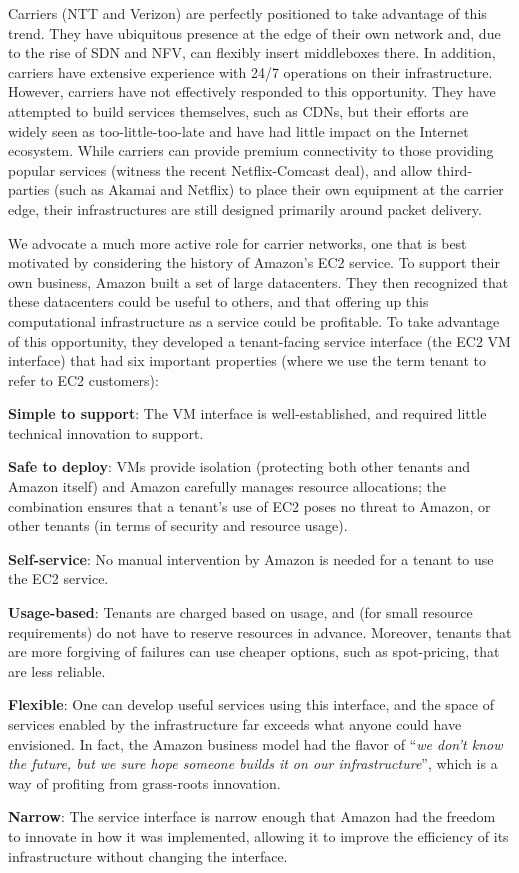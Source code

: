 Carriers (\eg NTT and Verizon) are perfectly positioned to take advantage of this trend. They have ubiquitous presence at the edge of their own network and, due to the rise of SDN and NFV, can flexibly insert middleboxes there. In addition, carriers have extensive experience with 24/7 operations on their infrastructure. However, carriers have not effectively responded to this opportunity. They have attempted to build services themselves, such as CDNs, but their efforts are widely seen as too-little-too-late and have had little impact on the Internet ecosystem. While carriers can provide premium connectivity to those providing popular services (witness the recent Netflix-Comcast deal), and allow third-parties (such as Akamai and Netflix) to place their own equipment at the carrier edge, their infrastructures are still designed primarily around packet delivery.

We advocate a much more active role for carrier networks, one that is best motivated by considering the history of Amazon's EC2 service. To support their own business, Amazon built a set of large datacenters. They then recognized that these datacenters could be useful to others, and that offering up this computational infrastructure as a service could be profitable. To take advantage of this opportunity, they developed a tenant-facing service interface (the EC2 VM interface) that had six important properties (where we use the term tenant to refer to EC2 customers):
\begin{compactitem}
\item {\bf Simple to support}: The VM interface is well-established, and required little technical innovation to support.
\item {\bf Safe to deploy}: VMs provide isolation (protecting both other tenants and Amazon itself) and Amazon carefully manages resource allocations; the combination ensures that a tenant's use of EC2 poses no threat to Amazon, or other tenants (in terms of security and resource usage).
\item {\bf Self-service}: No manual intervention by Amazon is needed for a tenant to use the EC2 service.
\item {\bf Usage-based}: Tenants are charged based on usage, and (for small resource requirements) do not have to reserve resources in advance. Moreover, tenants that are more forgiving of failures can use cheaper options, such as spot-pricing, that are less reliable.
\item {\bf Flexible}: One can develop useful services using this interface, and the space of services enabled by the infrastructure far exceeds what anyone could have envisioned. In fact, the Amazon business model had the flavor of ``{\em we don't know the future, but we sure hope someone builds it on our infrastructure}'', which is a way of profiting from grass-roots innovation.
\item {\bf Narrow}: The service interface is narrow enough that Amazon had the freedom to innovate in how it was implemented, allowing it to improve the efficiency of its infrastructure without changing the interface. 
\end{compactitem}

